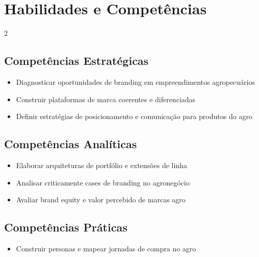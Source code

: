 \documentclass[11pt,a4paper]{article}
\begin{document}
\section*{Habilidades e Competências}

\begin{multicols}{2}

\subsection*{Competências Estratégicas}

\begin{itemize}

\item Diagnosticar oportunidades de branding em empreendimentos agropecuários

\item Construir plataformas de marca coerentes e diferenciadas

\item Definir estratégias de posicionamento e comunicação para produtos do agro

\end{itemize}

\subsection*{Competências Analíticas}

\begin{itemize}

\item Elaborar arquiteturas de portfólio e extensões de linha

\item Analisar criticamente cases de branding no agronegócio

\item Avaliar brand equity e valor percebido de marcas agro

\end{itemize}

\columnbreak

\subsection*{Competências Práticas}

\begin{itemize}

\item Construir personas e mapear jornadas de compra no agro


\end{itemize}
\end{multicols}
\end{document}
